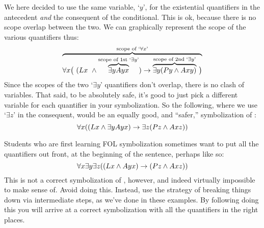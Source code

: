 We here decided to use the same variable, `$y$', for the existential quantifiers in the antecedent \emph{and} the consequent of the conditional. This is ok, because there is no scope overlap between the two. We can graphically represent the scope of the various quantifiers thus:
$$\overbrace{\forall x\bigl(\ (Lx \ \wedge \overbrace{\exists yAyx}^{\text{scope of 1st `}\exists y\text{'}}) \rightarrow \overbrace{\exists y(Py \wedge Axy)}^{\text{scope of 2nd `}\exists y\text{'}} \ \bigr)}^{\text{scope of `}\forall x\text{'}}$$
Since the scopes of the two `$\exists y$' quantifiers don't overlap, there is no clash of variables.   That said, to be absolutely safe, it's good to just pick a different variable for each quantifier in your symbolization.  So the following, where we use `$\exists z$' in the consequent, would be an equally good, and ``safer,'' symbolization of :$$\forall x((Lx \wedge \exists yAyx) \rightarrow \exists z(Pz \wedge Axz))$$

Students who are first learning FOL symbolization sometimes want to put all the quantifiers out front, at the beginning of the sentence, perhaps like so:
$$\forall x\exists y \exists z((Lx \wedge Ayx) \rightarrow (Pz \wedge Axz))$$
This is not a correct symbolization of , however, and indeed virtually impossible to make sense of.  Avoid doing this.  Instead, use the strategy of breaking things down via intermediate steps, as we've done in these examples.  By following doing this you will arrive at a correct symbolization with all the quantifiers in the right places.




